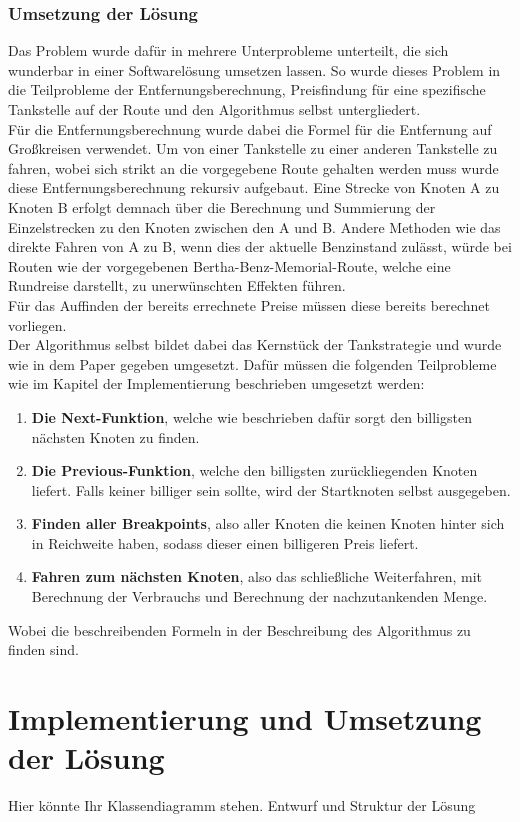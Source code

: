 \documentclass[11pt]{article}
\begin{document}
\subsubsection{Umsetzung der Lösung}
	Das Problem wurde dafür in mehrere Unterprobleme unterteilt, die sich wunderbar in einer Softwarelösung umsetzen lassen. So wurde dieses Problem in die Teilprobleme der Entfernungsberechnung, Preisfindung für eine spezifische Tankstelle auf der Route und den Algorithmus selbst untergliedert. \\
	Für die Entfernungsberechnung wurde dabei die Formel für die Entfernung auf Großkreisen verwendet. Um von einer Tankstelle zu einer anderen Tankstelle zu fahren, wobei sich strikt an die vorgegebene Route gehalten werden muss wurde diese Entfernungsberechnung rekursiv aufgebaut. Eine Strecke von Knoten A zu Knoten B erfolgt demnach über die Berechnung und Summierung der Einzelstrecken zu den Knoten zwischen den A und B. Andere Methoden wie das direkte Fahren von A zu B, wenn dies der aktuelle Benzinstand zulässt, würde bei Routen wie der vorgegebenen Bertha-Benz-Memorial-Route, welche eine Rundreise darstellt, zu unerwünschten Effekten führen. \\
	Für das Auffinden der bereits errechnete Preise müssen diese bereits berechnet vorliegen. \\
	Der Algorithmus selbst bildet dabei das Kernstück der Tankstrategie und wurde wie in dem Paper gegeben umgesetzt. Dafür müssen die folgenden Teilprobleme wie im Kapitel der Implementierung beschrieben umgesetzt werden:
	\begin{enumerate}
		\item \textbf{Die Next-Funktion}, welche wie beschrieben dafür sorgt den billigsten nächsten Knoten zu finden.
		\item \textbf{Die Previous-Funktion}, welche den billigsten zurückliegenden Knoten liefert. Falls keiner billiger sein sollte, wird der Startknoten selbst ausgegeben.
		\item \textbf{Finden aller Breakpoints}, also aller Knoten die keinen Knoten hinter sich in Reichweite haben, sodass dieser einen billigeren Preis liefert.
		\item \textbf{Fahren zum nächsten Knoten}, also das schließliche Weiterfahren, mit Berechnung der Verbrauchs und Berechnung der nachzutankenden Menge.
	\end{enumerate}
	Wobei die beschreibenden Formeln in der Beschreibung des Algorithmus zu finden sind.
\section{Implementierung und Umsetzung der Lösung}
	Hier könnte Ihr Klassendiagramm stehen.	
	Entwurf und Struktur der Lösung
\end{document}
